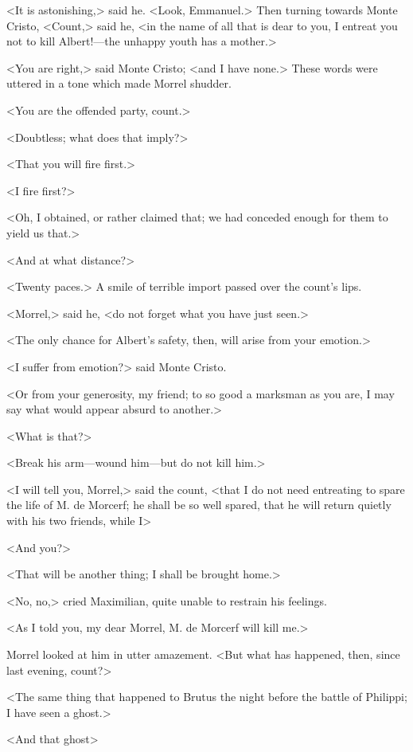  <It is astonishing,> said he. <Look, Emmanuel.> Then turning towards Monte Cristo, <Count,> said he, <in the name of all that is dear to you, I entreat you not to kill Albert!—the unhappy youth has a mother.> 

 <You are right,> said Monte Cristo; <and I have none.> These words were uttered in a tone which made Morrel shudder. 

 <You are the offended party, count.> 

 <Doubtless; what does that imply?> 

 <That you will fire first.> 

 <I fire first?> 

 <Oh, I obtained, or rather claimed that; we had conceded enough for them to yield us that.> 

 <And at what distance?> 

 <Twenty paces.> A smile of terrible import passed over the count's lips. 

 <Morrel,> said he, <do not forget what you have just seen.> 

 <The only chance for Albert's safety, then, will arise from your emotion.> 

 <I suffer from emotion?> said Monte Cristo. 

 <Or from your generosity, my friend; to so good a marksman as you are, I may say what would appear absurd to another.> 

 <What is that?> 

 <Break his arm—wound him—but do not kill him.> 

 <I will tell you, Morrel,> said the count, <that I do not need entreating to spare the life of M. de Morcerf; he shall be so well spared, that he will return quietly with his two friends, while I\longdash> 

 <And you?> 

 <That will be another thing; I shall be brought home.> 

 <No, no,> cried Maximilian, quite unable to restrain his feelings. 

 <As I told you, my dear Morrel, M. de Morcerf will kill me.> 

 Morrel looked at him in utter amazement. <But what has happened, then, since last evening, count?> 

 <The same thing that happened to Brutus the night before the battle of Philippi; I have seen a ghost.> 

 <And that ghost\longdash> 

